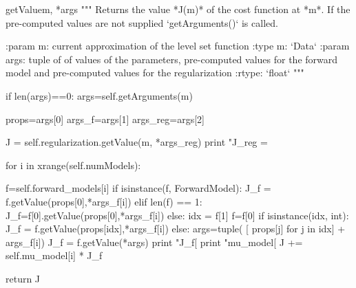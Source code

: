 \begin{methoddesc}[InversionCostFunction]{getValue}{m, *args}
        """
        Returns the value *J(m)* of the cost function at *m*.
        If the pre-computed values are not supplied `getArguments()` is called.

        :param m: current approximation of the level set function
        :type m: `Data`
        :param args: tuple of of values of the parameters, pre-computed values for the forward model and
                 pre-computed values for the regularization
        :rtype: `float`
        """

        if len(args)==0:
            args=self.getArguments(m)
        
        props=args[0]
        args_f=args[1]
        args_reg=args[2]
        
        J = self.regularization.getValue(m, *args_reg)
        print "J_reg = %
                
        for i in xrange(self.numModels):
                 
           f=self.forward_models[i]
           if isinstance(f, ForwardModel): 
              J_f = f.getValue(props[0],*args_f[i])
           elif len(f) == 1:
              J_f=f[0].getValue(props[0],*args_f[i])
           else:
              idx = f[1]
              f=f[0]
              if isinstance(idx, int):
                 J_f = f.getValue(props[idx],*args_f[i])
              else:
                 args=tuple( [ props[j] for j in idx] + args_f[i])
                 J_f = f.getValue(*args)
           print "J_f[%
           print "mu_model[%
           J += self.mu_model[i] * J_f
           
        return   J
\end{methoddesc}

